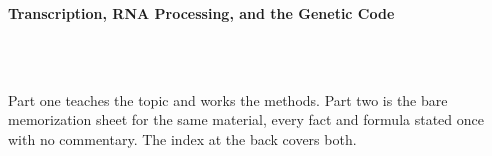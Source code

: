 



\makeindex[title={Index of This Volume},columns=2,intoc]

\begin{titlepage}\thispagestyle{empty}
\vspace*{0.14\textheight}
\noindent{\color{tiercore}\rule{\textwidth}{5pt}}\\[3pt]
\noindent{\color{bioline}\rule{\textwidth}{1pt}}\\[26pt]
\\[12pt]
\noindent\begin{minipage}{\textwidth}\raggedright
{\sffamily\bfseries\fontsize{28}{32}\selectfont\color{bioink}%
 \hyphenchar{} Transcription, RNA Processing, and the Genetic Code\par}\end{minipage}\\[16pt]
\noindent{\color{biogreen}\rule{\textwidth}{1.4pt}}\\[10pt]
\noindent\begin{minipage}{\textwidth}\raggedright
{\fontsize{10.5}{14}\selectfont\color{biogreen}%
Part one teaches the topic and works the methods. Part two is the bare memorization sheet for the
same material, every fact and formula stated once with no commentary. The index at the back covers both.\par}\end{minipage}
\vfill
\noindent{\color{bioline}\rule{\textwidth}{1pt}}\\[3pt]
\noindent{\color{tiercore}\rule{\textwidth}{5pt}}
\end{titlepage}
\tableofcontents
\clearpage
{}
\clearpage
\printindex

